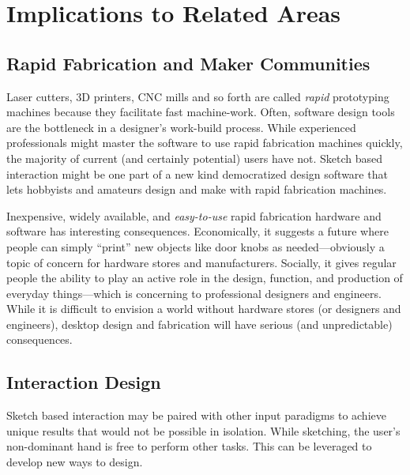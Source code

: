 \section{Implications to Related Areas}

\subsection{Rapid Fabrication and Maker Communities}

Laser cutters, 3D printers, CNC mills and so forth are called
\textit{rapid} prototyping machines because they facilitate fast
machine-work. Often, software design tools are the bottleneck in a
designer's work-build process. While experienced professionals might
master the software to use rapid fabrication machines quickly, the
majority of current (and certainly potential) users have not. Sketch
based interaction might be one part of a new kind democratized design
software that lets hobbyists and amateurs design and make with rapid
fabrication machines.

Inexpensive, widely available, and \textit{easy-to-use} rapid
fabrication hardware and software has interesting
consequences. Economically, it suggests a future where people can
simply ``print'' new objects like door knobs as needed---obviously a
topic of concern for hardware stores and manufacturers. Socially, it
gives regular people the ability to play an active role in the design,
function, and production of everyday things---which is concerning to
professional designers and engineers. While it is difficult to
envision a world without hardware stores (or designers and engineers),
desktop design and fabrication will have serious (and unpredictable)
consequences.

\subsection{Interaction Design}

Sketch based interaction may be paired with other input paradigms to
achieve unique results that would not be possible in isolation. While
sketching, the user's non-dominant hand is free to perform other
tasks. This can be leveraged to develop new ways to design. 

